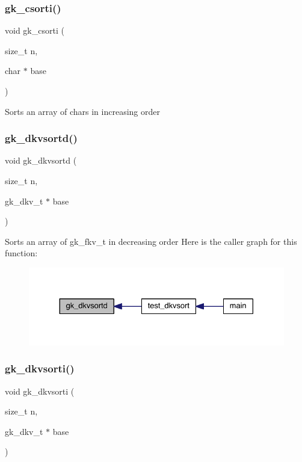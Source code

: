 \subsubsection{\texorpdfstring{gk\+\_\+csorti()}{gk\_csorti()}}
{\footnotesize\ttfamily void gk\+\_\+csorti (\begin{DoxyParamCaption}\item[{size\+\_\+t}]{n,  }\item[{char $\ast$}]{base }\end{DoxyParamCaption})}

Sorts an array of chars in increasing order \mbox{\label{a00140_ac8a7384657265b7085aa5a17b970e88e}} 
\subsubsection{\texorpdfstring{gk\+\_\+dkvsortd()}{gk\_dkvsortd()}}
{\footnotesize\ttfamily void gk\+\_\+dkvsortd (\begin{DoxyParamCaption}\item[{size\+\_\+t}]{n,  }\item[{gk\+\_\+dkv\+\_\+t $\ast$}]{base }\end{DoxyParamCaption})}

Sorts an array of gk\+\_\+fkv\+\_\+t in decreasing order Here is the caller graph for this function\+:\nopagebreak
\begin{figure}[H]
\begin{center}
\leavevmode
\includegraphics[width=330pt]{a00140_ac8a7384657265b7085aa5a17b970e88e_icgraph}
\end{center}
\end{figure}
\mbox{\label{a00140_aa7b778397ac67a5f9f61b0eaaec281f7}} 
\subsubsection{\texorpdfstring{gk\+\_\+dkvsorti()}{gk\_dkvsorti()}}
{\footnotesize\ttfamily void gk\+\_\+dkvsorti (\begin{DoxyParamCaption}\item[{size\+\_\+t}]{n,  }\item[{gk\+\_\+dkv\+\_\+t $\ast$}]{base }\end{DoxyParamCaption})}

